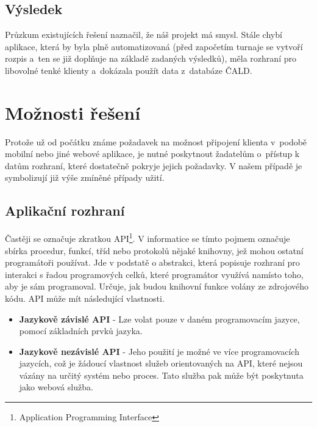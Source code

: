 \subsection{Výsledek}

\indent

Průzkum existujících řešení naznačil, že náš projekt má smysl. Stále chybí aplikace,
která by byla plně automatizovaná (před započetím turnaje se vytvoří rozpis a~ten se
již doplňuje na základě zadaných výsledků), měla rozhraní pro libovolné tenké klienty
a~dokázala použít data z~databáze ČALD.

\section{Možnosti řešení}

\indent

Protože už od počátku známe požadavek na možnost připojení klienta v~podobě mobilní nebo jiné webové aplikace,
je nutné poskytnout žadatelům o~přístup k datům rozhraní, které dostatečně pokryje jejich požadavky.
V našem případě je symbolizují již výše zmíněné případy užití.

\subsection{Aplikační rozhraní}

\indent

Častěji se označuje zkratkou API\footnote{Application Programming Interface}.
V informatice se tímto pojmem označuje sbírka procedur, funkcí, tříd
nebo protokolů nějaké knihovny, jež mohou ostatní programátoři používat.
Jde v podstatě o abstrakci, která popisuje rozhraní pro interakci s řadou programových celků,
které programátor využívá namísto toho, aby je sám programoval.
Určuje, jak budou knihovní funkce volány ze zdrojového kódu. API může mít následující vlastnosti.

\begin{itemize}
  \item \textbf{Jazykově závislé API} - Lze volat pouze v daném programovacím jazyce, pomocí základních prvků jazyka.
  \item \textbf{Jazykově nezávislé API} - Jeho použití je možné ve více programovacích jazycích, což je žádoucí vlastnost
    služeb orientovaných na API, které nejsou vázány na určitý systém nebo proces.
    Tato služba pak může být poskytnuta jako webová služba.
\end{itemize}

